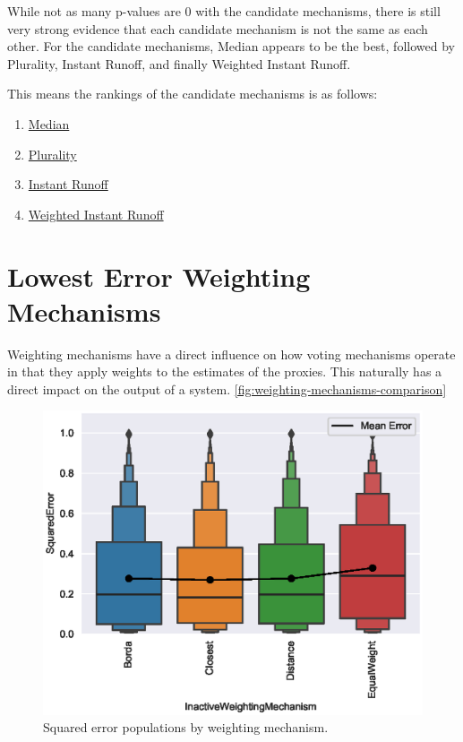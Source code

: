 While not as many p-values are 0 with the candidate mechanisms, there is still very
strong evidence that each candidate mechanism is not the same as each other.
For the candidate mechanisms, Median appears to be the best, followed
by Plurality, Instant Runoff, and finally Weighted Instant Runoff.
\begin{samepage}
    This means the rankings of the candidate mechanisms is as follows:
    \begin{enumerate}
        \item \hyperref[para:median]{Median}
        \item \hyperref[para:plurality]{Plurality}
        \item \hyperref[para:cand-instant-runoff]{Instant Runoff}
        \item \hyperref[para:cand-weighted-instant-runoff]{Weighted Instant Runoff}
    \end{enumerate}
\end{samepage}


\section{Lowest Error Weighting Mechanisms}\label{sec:lowest-error-weighting-mechanism}
Weighting mechanisms have a direct influence on how voting mechanisms operate in that
they apply weights to the estimates of the proxies.
This naturally has a direct impact on the output of a system.
\autoref{fig:weighting-mechanisms-comparison}

\begin{figure}[htbp]
    \centering
    \includegraphics[scale=0.75]
    {./content/figures/weighting_mechanisms/weighting_mechanisms_comparison}
    \caption{Squared error populations by weighting mechanism.}
    \label{fig:weighting-mechanisms-comparison}
\end{figure}

